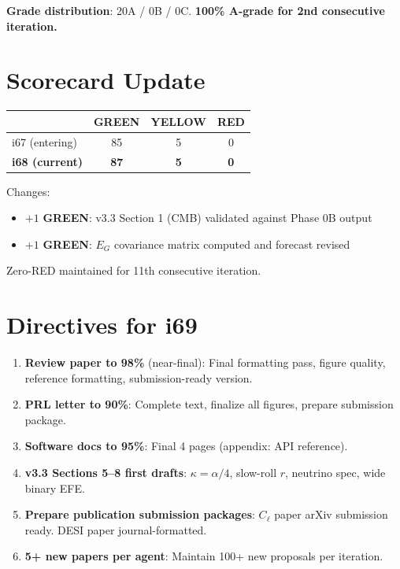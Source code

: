 \documentclass[11pt,a4paper]{article}
\newcommand{\GREEN}{\textcolor{dfdgreen}{\textbf{GREEN}}}
\newcommand{\YELLOW}{\textcolor{dfdyellow}{\textbf{YELLOW}}}
\newcommand{\RED}{\textcolor{dfdred}{\textbf{RED}}}
\begin{document}
\textbf{Grade distribution}: 20A / 0B / 0C. \textbf{100\% A-grade for 2nd consecutive iteration.}


\section{Scorecard Update}
\label{sec:scorecard}

\begin{center}
\begin{tabular}{lccc}
\toprule
& \GREEN & \YELLOW & \RED \\
\midrule
i67 (entering) & 85 & 5 & 0 \\
\textbf{i68 (current)} & \textbf{87} & \textbf{5} & \textbf{0} \\
\bottomrule
\end{tabular}
\end{center}

Changes:
\begin{itemize}[nosep]
\item $+1$ \GREEN: v3.3 Section 1 (CMB) validated against Phase 0B output
\item $+1$ \GREEN: $E_G$ covariance matrix computed and forecast revised
\end{itemize}

Zero-RED maintained for 11th consecutive iteration.

\section{Directives for i69}
\label{sec:directives}

\begin{enumerate}
\item \textbf{Review paper to 98\%} (near-final): Final formatting pass, figure quality, reference formatting, submission-ready version.
\item \textbf{PRL letter to 90\%}: Complete text, finalize all figures, prepare submission package.
\item \textbf{Software docs to 95\%}: Final 4 pages (appendix: API reference).
\item \textbf{v3.3 Sections 5--8 first drafts}: $\kappa = \alpha/4$, slow-roll $r$, neutrino spec, wide binary EFE.
\item \textbf{Prepare publication submission packages}: $C_\ell$ paper arXiv submission ready. DESI paper journal-formatted.
\item \textbf{5+ new papers per agent}: Maintain 100+ new proposals per iteration.
\end{enumerate}
\end{document}

